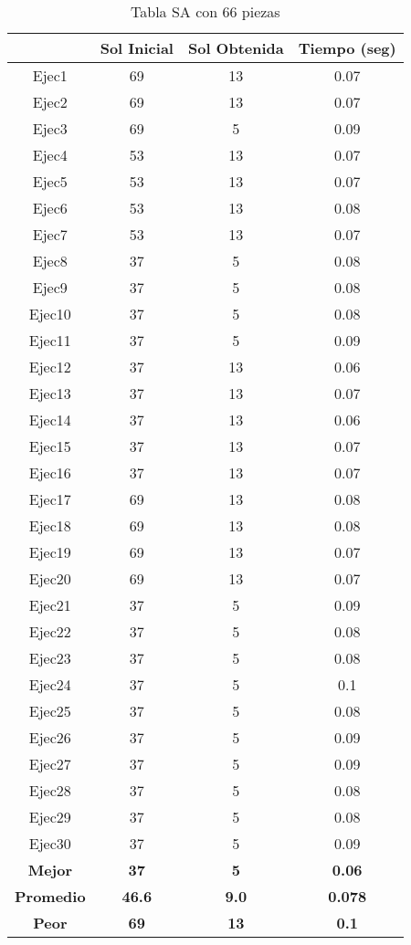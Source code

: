 
\begin{table}
\caption{Tabla SA con 66 piezas}
\centering
\begin{tabular}{|c|c|c|c|}
\hline
 & {\bf Sol Inicial} & {\bf Sol Obtenida} & {\bf Tiempo (seg)} \\
\hline
Ejec1 & 69 & 13  & 0.07 \\
\hline
Ejec2 & 69 & 13  & 0.07 \\
\hline
Ejec3 & 69 & 5  & 0.09 \\
\hline
Ejec4 & 53 & 13  & 0.07 \\
\hline
Ejec5 & 53 & 13  & 0.07 \\
\hline
Ejec6 & 53 & 13  & 0.08 \\
\hline
Ejec7 & 53 & 13  & 0.07 \\
\hline
Ejec8 & 37 & 5  & 0.08 \\
\hline
Ejec9 & 37 & 5  & 0.08 \\
\hline
Ejec10 & 37 & 5  & 0.08 \\
\hline
Ejec11 & 37 & 5  & 0.09 \\
\hline
Ejec12 & 37 & 13  & 0.06 \\
\hline
Ejec13 & 37 & 13  & 0.07 \\
\hline
Ejec14 & 37 & 13  & 0.06 \\
\hline
Ejec15 & 37 & 13  & 0.07 \\
\hline
Ejec16 & 37 & 13  & 0.07 \\
\hline
Ejec17 & 69 & 13  & 0.08 \\
\hline
Ejec18 & 69 & 13  & 0.08 \\
\hline
Ejec19 & 69 & 13  & 0.07 \\
\hline
Ejec20 & 69 & 13  & 0.07 \\
\hline
Ejec21 & 37 & 5  & 0.09 \\
\hline
Ejec22 & 37 & 5  & 0.08 \\
\hline
Ejec23 & 37 & 5  & 0.08 \\
\hline
Ejec24 & 37 & 5  & 0.1 \\
\hline
Ejec25 & 37 & 5  & 0.08 \\
\hline
Ejec26 & 37 & 5  & 0.09 \\
\hline
Ejec27 & 37 & 5  & 0.09 \\
\hline
Ejec28 & 37 & 5  & 0.08 \\
\hline
Ejec29 & 37 & 5  & 0.08 \\
\hline
Ejec30 & 37 & 5  & 0.09 \\
\hline
{\bf Mejor} & {\bf 37} & {\bf 5} & {\bf 0.06} \\
\hline
{\bf Promedio} & {\bf 46.6} & {\bf 9.0} & {\bf 0.078} \\
\hline
{\bf Peor} & {\bf 69} & {\bf 13} & {\bf 0.1} \\
\hline
\end{tabular}
\end{table}

